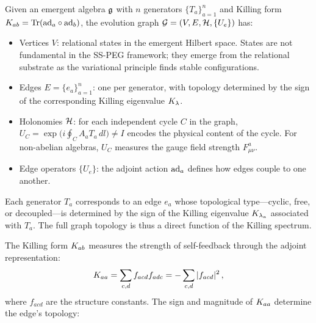 \begin{definition}\label{def:evolution_graph}
Given an emergent algebra $\mathfrak{g}$ with $n$ generators $\{T_a\}_{a=1}^n$ and Killing form $K_{ab} = \mathrm{Tr}(\mathrm{ad}_a \circ \mathrm{ad}_b)$, the evolution graph $\mathcal{G} = (V, E, \mathcal{H}, \{U_e\})$ has:
\begin{itemize}
    \item Vertices $V$: relational states in the emergent Hilbert space. States are not fundamental in the SS-PEG framework; they emerge from the relational substrate as the variational principle finds stable configurations.
    \item Edges $E = \{e_a\}_{a=1}^n$: one per generator, with topology determined by the sign of the corresponding Killing eigenvalue $K_{\lambda}$.
    \item Holonomies $\mathcal{H}$: for each independent cycle $C$ in the graph, $U_C = \exp\!\big(i \oint_C A_a T_a\,dl\big) \neq I$ encodes the physical content of the cycle. For non-abelian algebras, $U_C$ measures the gauge field strength $F_{\mu\nu}^a$.
    \item Edge operators $\{U_e\}$: the adjoint action $\mathrm{ad}_a$ defines how edges couple to one another.
\end{itemize}
\end{definition}

Each generator $T_a$ corresponds to an edge $e_a$ whose topological type---cyclic, free, or decoupled---is determined by the sign of the Killing eigenvalue $K_{\lambda_a}$ associated with $T_a$. The full graph topology is thus a direct function of the Killing spectrum.

The Killing form $K_{ab}$ measures the strength of self-feedback through the adjoint representation:
\begin{equation}
K_{aa} = \sum_{c,d} f_{acd} f_{adc} = -\sum_{c,d} |f_{acd}|^2\,,
\end{equation}
where $f_{acd}$ are the structure constants. The sign and magnitude of $K_{aa}$ determine the edge's topology:

